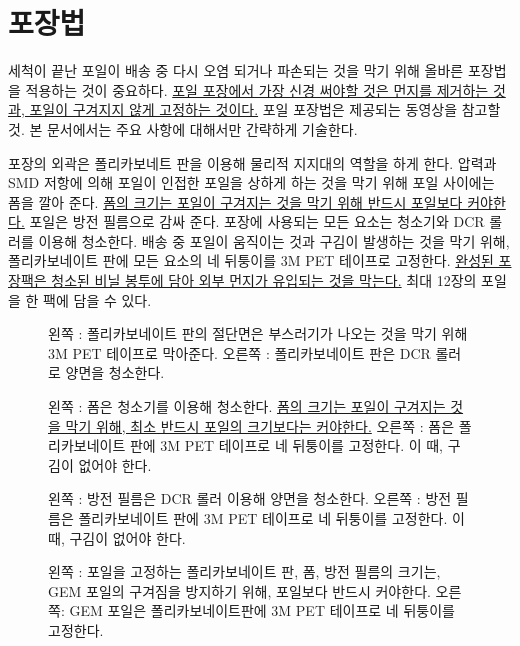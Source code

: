 \section{포장법}
세척이 끝난 포일이 배송 중 다시 오염 되거나 파손되는 것을 막기 위해 올바른 포장법을 적용하는 것이 중요하다. \uline{포일 포장에서 가장 신경 써야할 것은 먼지를 제거하는 것과, 포일이 구겨지지 않게 고정하는 것이다.} 포일 포장법은 제공되는 동영상을 참고할 것. 본 문서에서는 주요 사항에 대해서만 간략하게 기술한다.

포장의 외곽은 폴리카보네트 판을 이용해 물리적 지지대의 역할을 하게 한다. 압력과 SMD 저항에 의해 포일이 인접한 포일을 상하게 하는 것을 막기 위해 포일 사이에는 폼을 깔아 준다. \uline{폼의 크기는 포일이 구겨지는 것을 막기 위해 반드시 포일보다 커야한다.} 포일은 방전 필름으로 감싸 준다. 포장에 사용되는 모든 요소는 청소기와 DCR 롤러를 이용해 청소한다. 배송 중 포일이 움직이는 것과 구김이 발생하는 것을 막기 위해, 폴리카보네이트 판에 모든 요소의 네 뒤퉁이를 3M PET 테이프로 고정한다. \uline{완성된 포장팩은 청소된 비닐 봉투에 담아 외부 먼지가 유입되는 것을 막는다.} 최대 12장의 포일을 한 팩에 담을 수 있다.

\begin{figure}[htb]
  \centering
  \caption[폴리카보네이트 판의 절단면 처리]{왼쪽 : 폴리카보네이트 판의 절단면은 부스러기가 나오는 것을 막기 위해 3M PET 테이프로 막아준다. 오른쪽 : 폴리카보네이트 판은 DCR 롤러로 양면을 청소한다.}
  \label{fig:polycarbonate}
\end{figure}

\begin{figure}[htb]
  \centering
  \caption[폼의 처리]{왼쪽 : 폼은 청소기를 이용해 청소한다. \uline{폼의 크기는 포일이 구겨지는 것을 막기 위해, 최소 반드시 포일의 크기보다는 커야한다.} 오른쪽 : 폼은 폴리카보네이트 판에 3M PET 테이프로 네 뒤퉁이를 고정한다. 이 때, 구김이 없어야 한다.}
  \label{fig:foam}
\end{figure}

\begin{figure}[htb]
  \centering
  \caption[방전 필름의 처리]{왼쪽 : 방전 필름은 DCR 롤러 이용해 양면을 청소한다. 오른쪽 : 방전 필름은 폴리카보네이트 판에 3M PET 테이프로 네 뒤퉁이를 고정한다. 이 때, 구김이 없어야 한다.}
  \label{fig:anti_static}
\end{figure}
\begin{figure}[htb]
  \centering
  \caption[GEM 포일의 고정]{왼쪽 : 포일을 고정하는 폴리카보네이트 판, 폼, 방전 필름의 크기는, GEM 포일의 구겨짐을 방지하기 위해, 포일보다 반드시 커야한다. 오른쪽: GEM 포일은 폴리카보네이트판에 3M PET 테이프로 네 뒤퉁이를 고정한다.}
  \label{fig:fixing_foil}
\end{figure}
